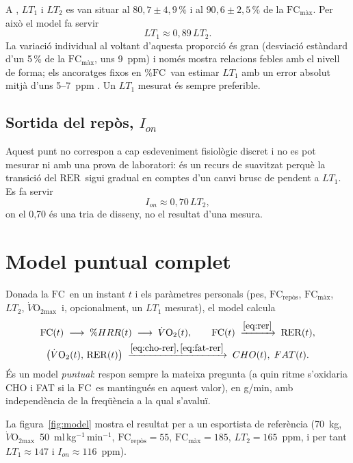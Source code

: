 \documentclass[10pt,a4paper]{article}
\newcommand{\VO}{\ensuremath{\dot V\mathrm{O_2}}}
\newcommand{\VOmax}{\ensuremath{\dot V\mathrm{O_{2max}}}}
\newcommand{\RER}{\ensuremath{\mathrm{RER}}}
\newcommand{\FC}{\ensuremath{\mathrm{FC}}}
\newcommand{\mlkgmin}{ml\,kg$^{-1}$\,min$^{-1}$}
\begin{document}
\noindent A \citet{nuuttila2025}, $LT_1$ i $LT_2$ es van situar al
$80{,}7\pm4{,}9\,\%$ i al $90{,}6\pm2{,}5\,\%$ de la $\FC_{\mathrm{màx}}$. Per això el model
fa servir
\begin{equation}
  LT_1\approx0{,}89\,LT_2 .
\end{equation}
La variació individual al voltant d'aquesta proporció és gran (desviació estàndard
d'un 5\,\% de la $\FC_{\mathrm{màx}}$, uns 9~ppm) i només mostra relacions febles amb el
nivell de forma; els ancoratges fixos en \%\FC\ van estimar $LT_1$ amb un error
absolut mitjà d'uns 5--7~ppm \citep{nuuttila2025}. Un $LT_1$ mesurat és sempre
preferible.

\subsection{Sortida del repòs, $I_{on}$}
Aquest punt no correspon a cap esdeveniment fisiològic discret i no es pot mesurar
ni amb una prova de laboratori: és un recurs de suavitzat perquè la transició del
\RER\ sigui gradual en comptes d'un canvi brusc de pendent a $LT_1$. Es fa servir
\begin{equation}
  I_{on}\approx0{,}70\,LT_2 ,
\end{equation}
on el 0,70 és una tria de disseny, no el resultat d'una mesura.

\section{Model puntual complet}\label{sec:complet}

Donada la \FC\ en un instant $t$ i els paràmetres personals (pes, $\FC_{\mathrm{repòs}}$,
$\FC_{\mathrm{màx}}$, $LT_2$, \VOmax\ i, opcionalment, un $LT_1$ mesurat), el model calcula
\begin{gather}
  \FC(t)\;\longrightarrow\;\%HRR(t)\;\longrightarrow\;\VO(t),
  \qquad \FC(t)\;\xrightarrow{\eqref{eq:rer}}\;\RER(t),\notag\\
  \bigl(\VO(t),\,\RER(t)\bigr)\;\xrightarrow{\eqref{eq:cho-rer},\,\eqref{eq:fat-rer}}\;CHO(t),\;FAT(t).
\end{gather}
És un model \emph{puntual}: respon sempre la mateixa pregunta (a quin ritme
s'oxidaria CHO i FAT si la \FC\ es mantingués en aquest valor), en g/min, amb
independència de la freqüència a la qual s'avaluï.

La figura~\ref{fig:model} mostra el resultat per a un esportista de referència
(70~kg, \VOmax\ 50~\mlkgmin, $\FC_{\mathrm{repòs}}=55$, $\FC_{\mathrm{màx}}=185$, $LT_2=165$~ppm, i
per tant $LT_1\approx147$ i $I_{on}\approx116$~ppm).
\end{document}
